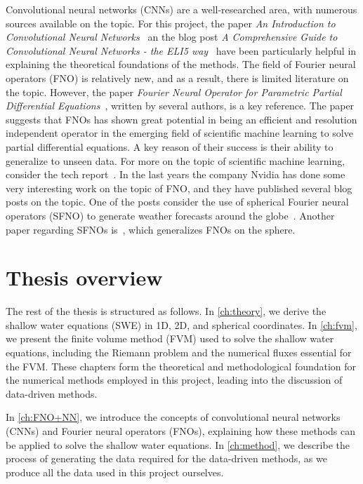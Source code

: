 Convolutional neural networks (CNNs) are a well-researched area, with numerous sources available on the topic.
For this project, the paper \textit{An Introduction to Convolutional Neural Networks}~\cite{oshea2015introductionconvolutionalneuralnetworks} an the blog post \textit{A Comprehensive Guide to Convolutional Neural Networks - the ELI5 way}~\cite{chollet2017comprehensive} have been particularly helpful in explaining the theoretical foundations of the methods.
The field of Fourier neural operators (FNO) is relatively new, and as a result, there is limited literature on the topic.
However, the paper \textit{Fourier Neural Operator for Parametric Partial Differential Equations}~\cite{FNO_2021}, written by several authors, is a key reference.
The paper suggests that FNOs has shown great potential in being an efficient and resolution independent operator in the emerging field of scientific machine learning to solve partial differential equations.
A key reason of their success is their ability to generalize to unseen data.
For more on the topic of scientific machine learning, consider the tech report~\cite{osti_1478744}.
In the last years the company Nvidia has done some very interesting work on the topic of FNO, and they have published several blog posts on the topic.
One of the posts consider the use of spherical Fourier neural operators (SFNO) to generate weather forecasts around the globe~\cite{Nvidia2023}.
Another paper regarding SFNOs is~\cite{bonev2023-SFNO}, which generalizes FNOs on the sphere.

\section{Thesis overview}
The rest of the thesis is structured as follows.
In \autoref{ch:theory}, we derive the shallow water equations (SWE) in 1D, 2D, and spherical coordinates.
In \autoref{ch:fvm}, we present the finite volume method (FVM) used to solve the shallow water equations, including the Riemann problem and the numerical fluxes essential for the FVM.
These chapters form the theoretical and methodological foundation for the numerical methods employed in this project, leading into the discussion of data-driven methods.

In \autoref{ch:FNO+NN}, we introduce the concepts of convolutional neural networks (CNNs) and Fourier neural operators (FNOs), explaining how these methods can be applied to solve the shallow water equations.
In \autoref{ch:method}, we describe the process of generating the data required for the data-driven methods, as we produce all the data used in this project ourselves.

